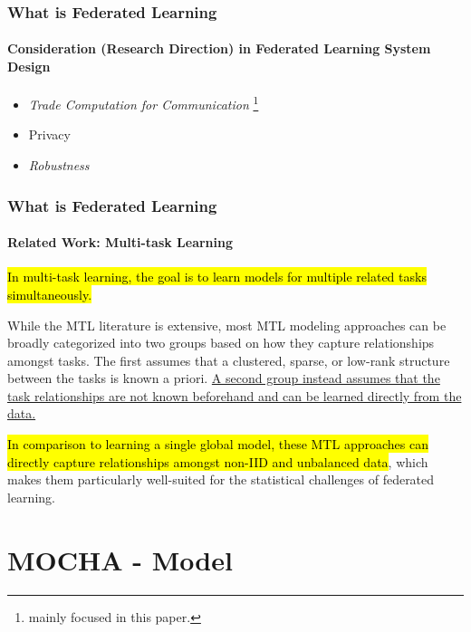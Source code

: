 \documentclass[UTF8,aspectratio=169,presentation]{ctexbeamer}
\makeatletter
\let\HL\hl
\renewcommand\hl{%
  \let\set@color\beamerorig@set@color
  \let\reset@color\beamerorig@reset@color
  \HL}
\makeatother
\begin{document}
\begin{frame}
  \frametitle{What is Federated Learning}
  \framesubtitle{Consideration (Research Direction) in Federated Learning System Design}

\begin{itemize}
  \item \textit{Trade Computation for Communication} \footnote{mainly focused in this paper.}
  \item Privacy
  \item \textit{Robustness} \footnotemark[\value{footnote}]
\end{itemize}

\vspace{1cm}


\end{frame}


\begin{frame}[t]
  \frametitle{What is Federated Learning}
  \framesubtitle{Related Work: Multi-task Learning}
  \hl{In multi-task learning, the goal is to learn models for multiple related tasks simultaneously.}

    While the MTL literature is extensive, most MTL modeling approaches can be broadly categorized into two groups based on how they capture relationships amongst tasks. The first assumes that a clustered, sparse, or low-rank structure between the tasks is known a priori. \ul{ A second group instead assumes that the task relationships are not known beforehand and can be learned directly from the data. }

    \hl{In comparison to learning a single global model, these MTL approaches can directly capture relationships amongst non-IID and unbalanced data}, which makes them particularly well-suited for the statistical challenges of federated learning.
  
\end{frame}


 \section{MOCHA - Model}
\end{document}
